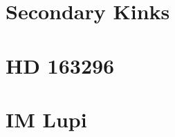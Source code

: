 
\section{Secondary Kinks}

\section{HD 163296} \label{sec:HD163wake}

\section{IM Lupi} \label{sec:IMLupiwake}